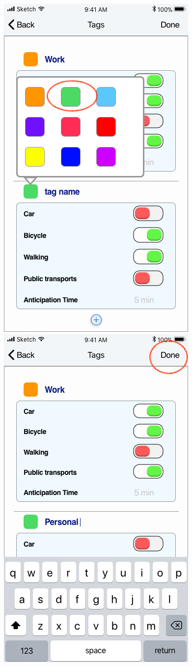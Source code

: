 \begin{figure}[H]
	\includegraphics[scale=0.23]{Images/Interface/Tags/2_tags_color}
	\hspace{0.5cm}
	\includegraphics[scale=0.23]{Images/Interface/Tags/3_tag_name}

\end{figure}
